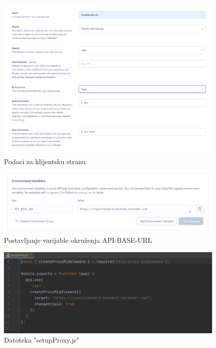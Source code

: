 		
		\begin{figure}[H]
			\includegraphics[width=\textwidth]{slike/osnovnipodacifrontend.PNG} 
			\caption{Podaci za klijentsku stranu}
			\label{fig:Podaci za klijentsku stranu}
		\end{figure}
		
		\begin{figure}[H]
			\includegraphics[width=\textwidth]{slike/environmentbaseurl.PNG} 
			\caption{Postavljanje varijable okruženja API-BASE-URL}
			\label{fig:Varijabla okruženja}
		\end{figure}	
	
	\begin{figure}[H]
		\includegraphics[width=\textwidth]{slike/setupproxy.PNG} 
		\caption{Datoteka "setupProxy.js"}
		\label{fig:Proxy}
	\end{figure}	
			\eject 
